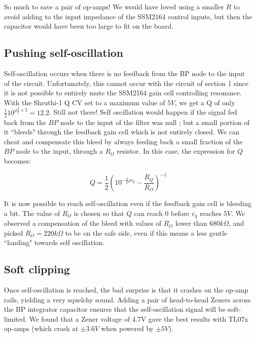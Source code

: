 \documentclass[a4paper,11pt]{article}
\begin{document}
So much to save a pair of op-amps! We would have loved using a smaller $R$ to avoid adding to the input impedance of the SSM2164 control inputs, but then the capacitor would have been too large to fit on the board.

\subsection{Pushing self-oscillation}

Self-oscillation occurs when there is no feedback from the BP node to the input of the circuit. Unfortunately, this cannot occur with the circuit of section 1 since it is not possible to entirely mute the SSM2164 gain cell controlling resonance. With the Shruthi-1 Q CV set to a maximum value of $5V$, we get a Q of only $\frac{1}{2} 10^{\rho \frac{3}{2} \times 5} = 12.2$. Still not there! Self oscillation would happen if the signal fed back from the $BP$ node to the input of the filter was null ; but a small portion of it ``bleeds" through the feedback gain cell which is not entirely closed. We can cheat and compensate this bleed by always feeding back a small fraction of the $BP$ node to the input, through a $R_O$ resistor. In this case, the expression for $Q$ becomes:

$$Q = \frac{1}{2} \left(10^{-\frac{3}{2} \rho v_{q}} - \frac{R_Q}{R_O}\right)^{-1}$$

It is now possible to reach self-oscillation even if the feedback gain cell is bleeding a bit. The value of $R_O$ is chosen so that $Q$ can reach 0 before $v_{q}$ reaches $5V$. We observed a compensation of the bleed with values of $R_O$ lower than $680k\Omega$, and picked $R_O = 220k\Omega$ to be on the safe side, even if this means a less gentle ``landing" towards self oscillation.

\subsection{Soft clipping}

Once self-oscillation is reached, the bad surprise is that it crashes on the op-amp rails, yielding a very squelchy sound. Adding a pair of head-to-head Zeners across the BP integrator capacitor ensures that the self-oscillation signal will be soft-limited. We found that a Zener voltage of 4.7V gave the best results with TL07x op-amps (which crash at $\pm 3.6V$ when powered by $\pm 5V$).
\end{document}
